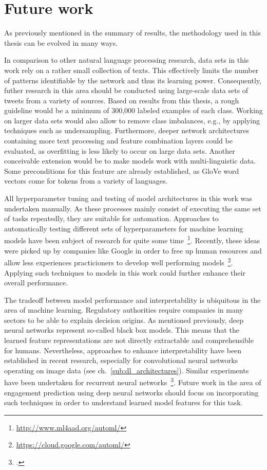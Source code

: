 \section{Future work}
\label{ch:future_work}

As previously mentioned in the summary of results, the methodology used in this
thesis can be evolved in many ways.

In comparison to other natural language processing research, data sets in this
work rely on a rather small collection of texts.
This effectively limits the number of patterns identifiable by the network and
thus its learning power.
Consequently, futher research in this area should be conducted using large-scale
data sets of tweets from a variety of sources.
Based on results from this thesis, a rough guideline would be a minimum
of 300,000 labeled examples of each class.
Working on larger data sets would also allow to remove class imbalances,
e.g., by applying techniques such as undersampling.
Furthermore, deeper network architectures containing more text processing
and feature combination layers could be evaluated, as overfitting is less likely
to occur on large data sets.
Another conceivable extension would be to make models work with multi-linguistic
data.
Some preconditions for this feature are already established, as GloVe word
vectors come for tokens from a variety of languages.

All hyperparameter tuning and testing of model architectures in this work was
undertaken manually.
As these processes mainly consist of executing the same set of tasks repeatedly,
they are suitable for automation.
Approaches to automatically testing different sets of hyperparameters for
machine learning models have been subject of research for quite some time~\footnote{\url{http://www.ml4aad.org/automl/}}.
Recently, these ideas were picked up by companies like Google in order to free
up human resources and allow less experiences practicioners to develop
well performing models~\footnote{\url{https://cloud.google.com/automl/}}.
Applying such techniques to models in this work could further enhance their
overall performance.

The tradeoff between model performance and interpretability is ubiquitous in
the area of machine learning.
Regulatory authorities require companies in many sectors to be able to explain
decision origins.
As mentioned previously, deep neural networks represent so-called black box models.
This means that the learned feature representations are not directly extractable
and comprehensible for humans.
Nevertheless, approaches to enhance interpretability have been established
in recent research, especially for convolutional neural networks operating
on image data (see ch.~\ref{sub:dl_architectures}).
Similar experiments have been undertaken for recurrent neural networks~\footcite{Karpathy2015}.
Future work in the area of engagement prediction using deep neural networks
should focus on incorporating such techniques in order to understand learned
model features for this task.

